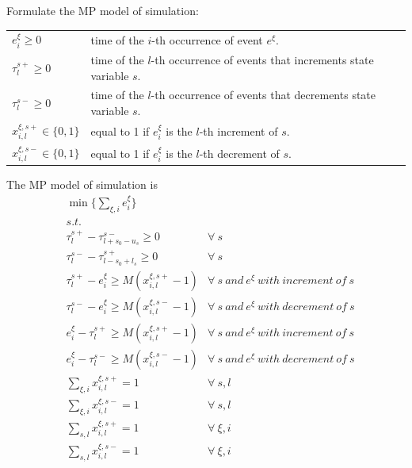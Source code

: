\documentclass[]{interact}
\theoremstyle{plain}%
\theoremstyle{definition}
\theoremstyle{remark}
\begin{document}
Formulate the MP model of simulation:

\begin{table}[h]
	\begin{tabular}{ll}
		\hline
		$e^{\xi}_{i}\ge 0$ & time of the $i$-th occurrence of event $e^{\xi}$.\\
		$\tau^{s+}_{l}\ge 0$ & time of the  $l$-th occurrence of events that increments state variable $s$.\\
		$\tau^{s-}_{l}\ge 0$ &   time of the  $l$-th occurrence of events that decrements state variable $s.$\\
		$x^{\xi,s+}_{i,l}\in\{0,1\}$& equal to 1 if $e^{\xi}_{i}$ is the $l$-th increment of $s$.\\
		$x^{\xi,s-}_{i,l}\in\{0,1\}$& equal to 1 if $e^{\xi}_{i}$ is the $l$-th decrement of $s$.\\\hline
	\end{tabular}
\end{table} 


The MP model of simulation is
\begin{eqnarray}
&\min\{\sum_{\xi,i} e^{\xi}_{i}\}&\\
&s.t.&\\
&\tau^{s+}_{l} - \tau^{s-}_{l+s_0-u_s} \ge 0& \forall\ s \\
&\tau^{s-}_{l} - \tau^{s+}_{l-s_0+l_s} \ge 0& \forall\ s \\
&\tau^{s+}_{l} - e^{\xi}_{i} \ge M(x^{\xi,s+}_{i,l}-1)& \forall\ s\ and\ e^{\xi}\ with\ increment\ of\ s\\
&\tau^{s-}_{l} - e^{\xi}_{i} \ge M(x^{\xi,s-}_{i,l}-1)& \forall\ s\ and\ e^{\xi}\ with\ decrement\ of\ s\\
&e^{\xi}_{i} - \tau^{s+}_{l} \ge M(x^{\xi,s+}_{i,l}-1) & \forall\ s\ and\ e^{\xi}\ with\ increment\ of\ s\\
&e^{\xi}_{i} - \tau^{s-}_{l} \ge M(x^{\xi,s-}_{i,l}-1) & \forall\ s\ and\ e^{\xi}\ with\ decrement\ of\ s\\
&\sum_{\xi,i} x^{\xi,s+}_{i,l} =1& \forall\ s,l\\
&\sum_{\xi,i} x^{\xi,s-}_{i,l} =1& \forall\ s,l\\
&\sum_{s,l} x^{\xi,s+}_{i,l} =1& \forall\ \xi,i\\
&\sum_{s,l} x^{\xi,s-}_{i,l} =1& \forall\ \xi,i\\
\end{eqnarray}
\end{document}
